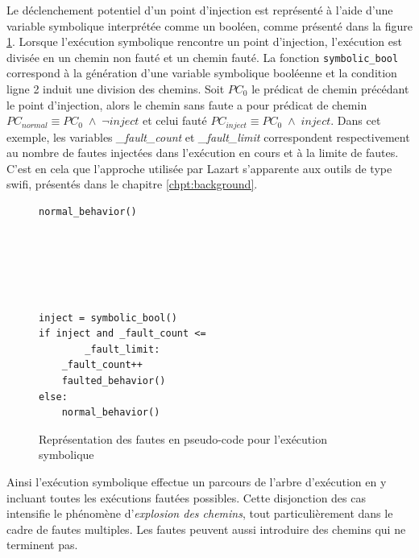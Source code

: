             Le déclenchement potentiel d'un point d'injection est représenté à l'aide d'une variable symbolique interprétée comme un booléen, comme présenté dans la figure \ref{fig:symbolic-ip-pc}. Lorsque l'exécution symbolique rencontre un point d'injection, l'exécution est divisée en un chemin non fauté et un chemin fauté. 
            La fonction \texttt{symbolic\_bool} correspond à la génération d'une variable symbolique booléenne et la condition ligne 2 induit une division des chemins.
            Soit $PC_0$ le prédicat de chemin précédant le point d'injection, alors le chemin sans faute a pour prédicat de chemin  $PC_{normal} \equiv PC_0 \; \wedge \; \neg inject$ et celui fauté  $PC_{inject} \equiv PC_0 \; \wedge \; inject$. 
            Dans cet exemple, les variables \textit{\_fault\_count} et \textit{\_fault\_limit} correspondent respectivement au nombre de fautes injectées dans l'exécution en cours et à la limite de fautes.
            C'est en cela que l'approche utilisée par Lazart s'apparente aux outils de type \gls{swifi}, présentés dans le chapitre \ref{chpt:background}.
    
            \begin{figure}[H]\centering
            \begin{multicols}{2}
\begin{lstlisting}
normal_behavior()






\end{lstlisting}  
\columnbreak

\begin{lstlisting}[label=lst-symbool]
inject = symbolic_bool()
if inject and _fault_count <= 
        _fault_limit:
    _fault_count++
    faulted_behavior()
else:
    normal_behavior()
\end{lstlisting}  
            \end{multicols}
            \caption{Représentation des fautes en pseudo-code pour l'exécution symbolique \label{fig:symbolic-ip-pc}}
            \end{figure}
        
            Ainsi l'exécution symbolique effectue un parcours de l'arbre d'exécution en y incluant toutes les exécutions fautées possibles. Cette disjonction des cas intensifie le phénomène d'\textit{explosion des chemins}, tout particulièrement dans le cadre de fautes multiples.
            Les fautes peuvent aussi introduire des chemins qui ne terminent pas.
            
